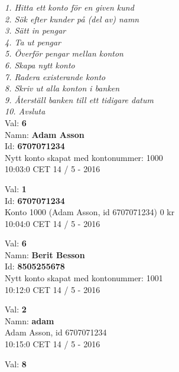 \begin{multicols}{2}
\noindent
\begin{exampleblock}
\textit{
1.   Hitta ett konto för en given kund\\
2.   Sök efter kunder på (del av) namn\\
3.   Sätt in pengar\\
4.   Ta ut pengar\\
5.   Överför pengar mellan konton\\
6.   Skapa nytt konto\\
7.   Radera existerande konto\\
8.   Skriv ut alla konton i banken\\
9.   Återställ banken till ett tidigare datum\\
10.  Avsluta\\
}
Val: \textbf{6}\\
Namn: \textbf{Adam Asson}\\
Id: \textbf{6707071234}\\
Nytt konto skapat med kontonummer: 1000\\
10:03:0 CET 14 / 5 - 2016\\
\end{exampleblock}
\begin{exampleblock}
Val: \textbf{1}\\
Id: \textbf{6707071234}\\
Konto 1000 (Adam Asson, id 6707071234) 0 kr\\
10:04:0 CET 14 / 5 - 2016\\
\end{exampleblock}
\begin{exampleblock}
Val: \textbf{6}\\
Namn: \textbf{Berit Besson}\\
Id: \textbf{8505255678}\\
Nytt konto skapat med kontonummer: 1001\\
10:12:0 CET 14 / 5 - 2016\\
\end{exampleblock}
\begin{exampleblock}
Val: \textbf{2}\\
Namn: \textbf{adam}\\
Adam Asson, id 6707071234\\
10:15:0 CET 14 / 5 - 2016\\
\end{exampleblock}
\begin{exampleblock}
Val: \textbf{8}\\

\end{exampleblock}
\end{multicols}
